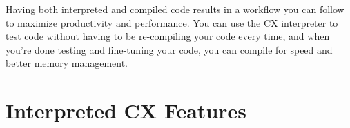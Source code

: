 \documentclass[11pt,fleqn,openany]{book} %
\begin{document}
Having both interpreted and compiled code results in a workflow you can follow to maximize productivity and performance. You can use the CX interpreter to test code without having to be re-compiling your code every time, and when you're done testing and fine-tuning your code, you can compile for speed and better memory management.

\section{Interpreted CX Features}

\end{document}
